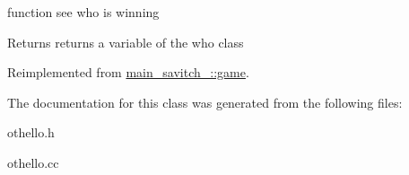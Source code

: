 function see who is winning \begin{DoxyReturn}{Returns}
returns a variable of the who class 
\end{DoxyReturn}


Reimplemented from \mbox{\hyperlink{classmain__savitch__14_1_1game_a2f0d5338c12bd98d52fe2383ece5c45e}{main\+\_\+savitch\+\_\+::game}}.



The documentation for this class was generated from the following files\+:\begin{DoxyCompactItemize}
\item 
othello.\+h\item 
othello.\+cc\end{DoxyCompactItemize}
